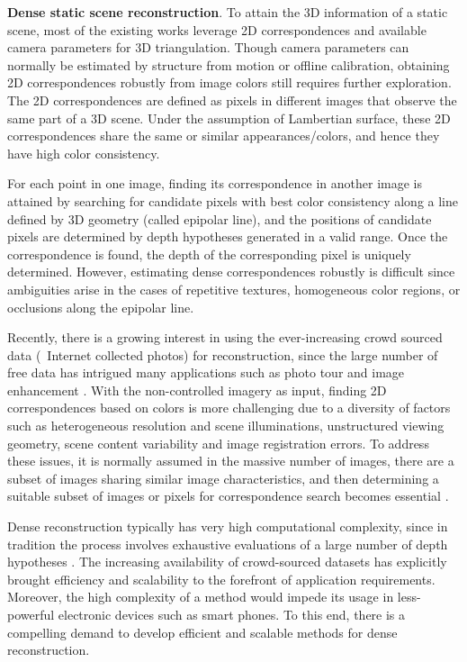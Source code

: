 \textbf{Dense static scene reconstruction}.
To attain the 3D information of a static scene, most of the existing works leverage 2D correspondences and available camera parameters for 3D triangulation. Though camera parameters can normally be estimated by structure from motion or offline calibration, obtaining 2D correspondences robustly from image colors still requires further exploration. The 2D correspondences are defined as pixels in different images that observe the same part of a 3D scene. Under the assumption of Lambertian surface, these 2D correspondences share the same or similar appearances/colors, and hence they have high color consistency.

For each point in one image, finding its correspondence in another image is attained by searching for candidate pixels with best color consistency along a line defined by 3D geometry (called epipolar line), and the positions of candidate pixels are determined by depth hypotheses generated in a valid range. Once the correspondence is found, the depth of the corresponding pixel is uniquely determined. However, estimating dense correspondences robustly is difficult since ambiguities arise in the cases of repetitive textures, homogeneous color regions, or occlusions along the epipolar line. 

Recently, there is a growing interest in using the ever-increasing crowd sourced data (\ie~Internet collected photos) for reconstruction, since the large number of free data has intrigued many applications such as photo tour \cite{Snavely2} and image enhancement \cite{zhang2014personal}. With the non-controlled imagery as input, finding 2D correspondences based on colors is more challenging due to a diversity of factors such as heterogeneous resolution and scene illuminations, unstructured viewing geometry, scene content variability and image registration errors. To address these issues, it is normally assumed in the massive number of images, there are a subset of images sharing similar image characteristics, and then determining a suitable subset of images or pixels for correspondence search becomes essential \cite{Goesele07}.

Dense reconstruction typically has very high computational complexity, since in tradition the process involves exhaustive evaluations of a large number of depth hypotheses \cite{yang2003multi}. The increasing availability of crowd-sourced datasets has explicitly brought efficiency and scalability to the forefront of application requirements.  Moreover, the high complexity of a method would impede its usage in less-powerful electronic devices such as smart phones. To this end, there is a compelling demand to develop efficient and scalable methods for dense reconstruction.

